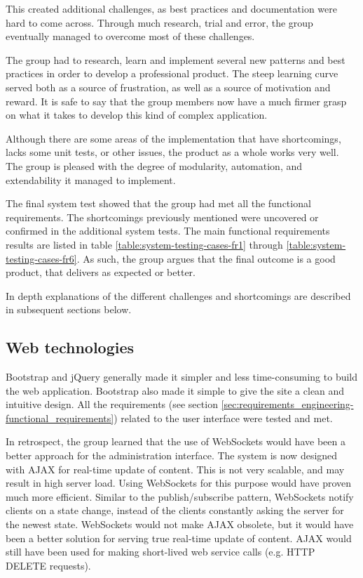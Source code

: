 This created additional challenges, as best practices and documentation were hard to come across. Through much research, trial and error, the group eventually managed to overcome most of these challenges.

The group had to research, learn and implement several new patterns and best practices in order to develop a professional product. The steep learning curve served both as a source of frustration, as well as a source of motivation and reward. It is safe to say that the group members now have a much firmer grasp on what it takes to develop this kind of complex application.

Although there are some areas of the implementation that have shortcomings, lacks some unit tests, or other issues, the product as a whole works very well. The group is pleased with the degree of modularity, automation, and extendability it managed to implement.

The final system test showed that the group had met all the functional requirements. The shortcomings previously mentioned were uncovered or confirmed in the additional system tests. The main functional requirements results are listed in table \ref{table:system-testing-cases-fr1} through \ref{table:system-testing-cases-fr6}. As such, the group argues that the final outcome is a good product, that delivers as expected or better.

In depth explanations of the different challenges and shortcomings are described in subsequent sections below.

\subsection{Web technologies}
\label{subsec:Web_technologies}

Bootstrap and jQuery generally made it simpler and less time-consuming to build the web application. Bootstrap also made it simple to give the site a clean and intuitive design. All the requirements (see section \ref{sec:requirements_engineering-functional_requirements}) related to the user interface were tested and met.

In retrospect, the group learned that the use of WebSockets \cite{web-sockets} would have been a better approach for the administration interface. The system is now designed with AJAX for real-time update of content. This is not very scalable, and may result in high server load. Using WebSockets for this purpose would have proven much more efficient. Similar to the publish/subscribe pattern, WebSockets notify clients on a state change, instead of the clients constantly asking the server for the newest state. WebSockets would not make AJAX obsolete, but it would have been a better solution for serving true real-time update of content. AJAX would still have been used for making short-lived web service calls (e.g. HTTP DELETE requests).

